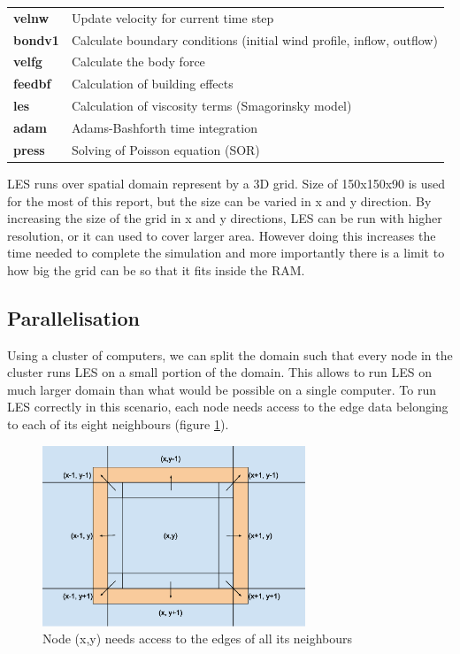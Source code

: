\documentclass{l4proj}
\begin{document}
\begin{tabular}{ | l | l | }
  \hline  
  \textbf{velnw} & Update velocity for current time step \\
  \textbf{bondv1} & Calculate boundary conditions (initial wind profile, inflow, outflow) \\
  \textbf{velfg} & Calculate the body force \\
  \textbf{feedbf} & Calculation of building effects \\
  \textbf{les} & Calculation of viscosity terms (Smagorinsky model) \\
  \textbf{adam} & Adams-Bashforth time integration \\
  \textbf{press} & Solving of Poisson equation (SOR) \\
  \hline  
\end{tabular}

LES runs over spatial domain represent by a 3D grid. Size of 150x150x90 is used for the most
of this report, but the size can be varied in x and y direction. By increasing the size of the
grid in x and y directions, LES can be run with higher resolution, or it can used 
to cover larger area. However doing this increases the time needed to complete the simulation
and more importantly there is a limit to how big the grid can be so that it fits inside the RAM.

\subsection{Parallelisation}

Using a cluster of computers, we can split the domain such that every node in the cluster runs
LES on a small portion of the domain. This allows to run LES on much larger domain than what would be
possible on a single computer. To run LES correctly in this scenario, each node needs access to the 
edge data belonging to each of its eight neighbours (figure \ref{fig:neighbours}).

\begin{figure}
\centering
\includegraphics[width=0.7\textwidth]{images/Neighbour_exchange.eps}
\caption{Node (x,y) needs access to the edges of all its neighbours}
\label{fig:neighbours}
\end{figure}
\end{document}
